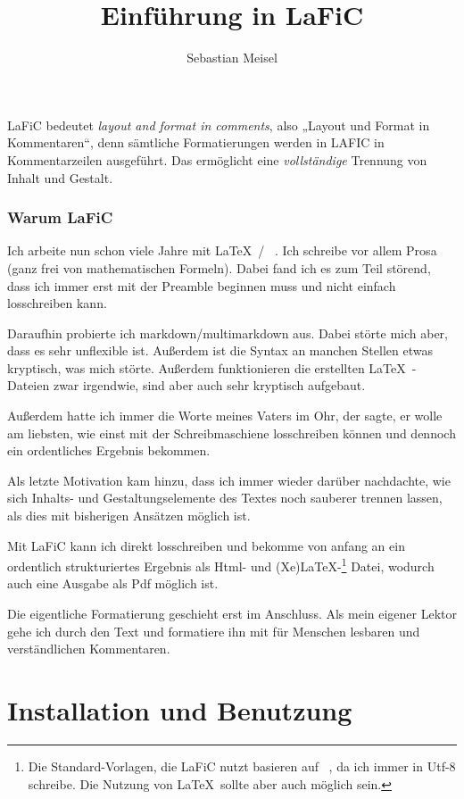 \documentclass{scrartcl}
\title{Einführung in LaFiC}
\author{Sebastian Meisel}
\begin{document}
\maketitle


LaFiC bedeutet \textit{layout and format in comments}, also „Layout
und Format in Kommentaren“, denn sämtliche Formatierungen
werden in LAFIC in Kommentarzeilen ausgeführt. Das
ermöglicht eine \emph{vollständige} Trennung von Inhalt und
Gestalt.

\section{Warum LaFiC}

Ich arbeite nun schon viele Jahre mit \LaTeX\  / \XeLaTeX\ . Ich
schreibe vor allem Prosa (ganz frei von mathematischen
Formeln). Dabei fand ich es zum Teil störend, dass ich immer
erst mit der Preamble beginnen muss und nicht einfach
losschreiben kann.

Daraufhin probierte ich markdown/multimarkdown aus. Dabei
störte mich aber, dass es sehr unflexible ist. Außerdem ist
die Syntax an manchen Stellen etwas kryptisch, was mich
störte. Außerdem funktionieren die erstellten \LaTeX\ -Dateien
zwar irgendwie, sind aber auch sehr kryptisch aufgebaut.

Außerdem hatte ich immer die Worte meines Vaters im Ohr, der
sagte, er wolle am liebsten, wie einst mit der
Schreibmaschiene losschreiben können und dennoch ein
ordentliches Ergebnis bekommen.

Als letzte Motivation kam hinzu, dass ich immer wieder
darüber nachdachte, wie sich Inhalts- und
Gestaltungselemente des Textes noch sauberer trennen lassen,
als dies mit bisherigen Ansätzen möglich ist.

Mit LaFiC kann ich direkt losschreiben und bekomme von
anfang an ein ordentlich strukturiertes Ergebnis als Html-
und (Xe)LaTeX-\footnote{Die Standard-Vorlagen, die LaFiC nutzt basieren auf \XeLaTeX\ , da ich immer in Utf-8 schreibe. Die Nutzung von \LaTeX\  sollte aber auch möglich sein.}\xspace Datei, wodurch auch eine Ausgabe als Pdf
möglich ist.

Die eigentliche Formatierung geschieht erst im
Anschluss. Als mein eigener Lektor gehe ich durch den Text
und formatiere ihn mit für Menschen lesbaren und
verständlichen Kommentaren.

\part{Installation und Benutzung}
\end{document}
